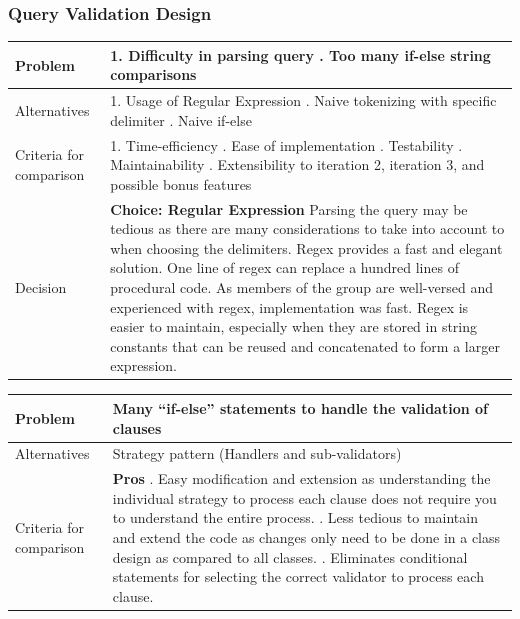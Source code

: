 \documentclass[12pt]{article}
\begin{document}
{{{{{{{{{{\subsubsection{Query Validation Design}
\begin{tabular}{|L{5cm} | L{12cm}| }
\hline
Problem &
1. Difficulty in parsing query
. Too many if-else string comparisons
 \\
    \hline
    Alternatives &
1. Usage of Regular Expression
. Naive tokenizing with specific delimiter
. Naive if-else
 \\
\hline
    Criteria for comparison &
1. Time-efficiency
. Ease of implementation
. Testability
. Maintainability
. Extensibility to iteration 2, iteration 3, and possible bonus features\\
 \hline
   Decision & \textbf{Choice:  Regular Expression}
\newline
Parsing the query may be tedious as there are many considerations to take into account to when choosing the delimiters. Regex provides a fast and elegant solution. One line of regex can replace a hundred lines of procedural code. As members of  the group are well-versed and experienced with regex, implementation was fast. Regex is easier to maintain, especially when they are stored in string constants that can be reused and concatenated to form a larger expression.
 \\
 \hline
\end{tabular}
\begin{tabular}{|L{5cm} | L{12cm}| }
\hline
{}Problem &
Many “if-else” statements to handle the validation of clauses
 \\
    \hline
{}Alternatives &
Strategy pattern (Handlers and sub-validators)
 \\
\hline
{}Criteria for comparison &

\textbf{Pros} . Easy modification and extension as understanding the individual strategy to process each clause does not require you to understand the entire process.
. Less tedious to maintain and extend the code as changes only need to be done in a class design as compared to all classes.
. Eliminates conditional statements for selecting the correct validator to process each clause. \newline


\end{tabular}}}}}}}}}}}
\end{document}
